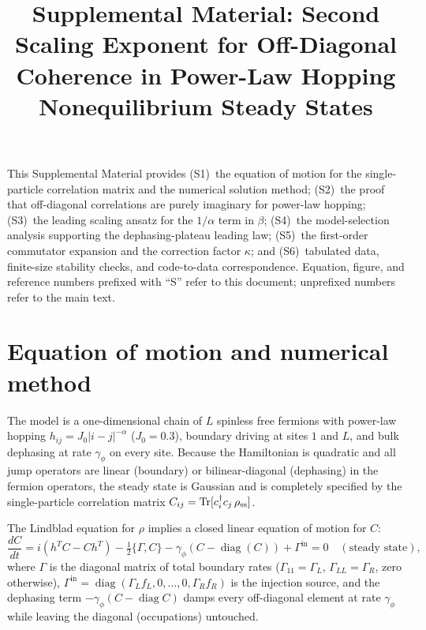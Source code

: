\documentclass[aps,prb,twocolumn,superscriptaddress]{revtex4-2}
\begin{document}
\title{Supplemental Material: Second Scaling Exponent for Off-Diagonal Coherence in Power-Law Hopping Nonequilibrium Steady States}

\author{}
\date{}

\maketitle

This Supplemental Material provides (S1)~the equation of motion for the single-particle correlation matrix and the numerical solution method; (S2)~the proof that off-diagonal correlations are purely imaginary for power-law hopping; (S3)~the leading scaling ansatz for the $1/\alpha$ term in $\beta$; (S4)~the model-selection analysis supporting the dephasing-plateau leading law; (S5)~the first-order commutator expansion and the correction factor $\kappa$; and (S6)~tabulated data, finite-size stability checks, and code-to-data correspondence. Equation, figure, and reference numbers prefixed with ``S'' refer to this document; unprefixed numbers refer to the main text.

\section{Equation of motion and numerical method}
\label{sec:S1}

The model is a one-dimensional chain of $L$ spinless free fermions with power-law hopping $h_{ij} = J_0|i-j|^{-\alpha}$ ($J_0 = 0.3$), boundary driving at sites $1$ and $L$, and bulk dephasing at rate $\gamma_\phi$ on every site. Because the Hamiltonian is quadratic and all jump operators are linear (boundary) or bilinear-diagonal (dephasing) in the fermion operators, the steady state is Gaussian and is completely specified by the single-particle correlation matrix $C_{ij} = \operatorname{Tr}[c_i^\dagger c_j\,\rho_{\rm ss}]$.

The Lindblad equation for $\rho$ implies a closed linear equation of motion for $C$:
\begin{equation}
\frac{dC}{dt} = i(h^T C - C h^T) - \tfrac{1}{2}\{\Gamma, C\} - \gamma_\phi (C - \operatorname{diag}(C)) + \Gamma^{\text{in}} = 0 \quad (\text{steady state}),
\tag{S1}
\end{equation}
where $\Gamma$ is the diagonal matrix of total boundary rates ($\Gamma_{11} = \Gamma_L$, $\Gamma_{LL} = \Gamma_R$, zero otherwise), $\Gamma^{\text{in}} = \operatorname{diag}(\Gamma_L f_L, 0, \dots, 0, \Gamma_R f_R)$ is the injection source, and the dephasing term $-\gamma_\phi(C - \operatorname{diag} C)$ damps every off-diagonal element at rate $\gamma_\phi$ while leaving the diagonal (occupations) untouched.
\end{document}
